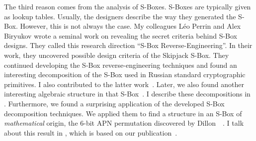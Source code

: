 The third reason comes from the analysis of S-Boxes. S-Boxes are typically given as lookup tables. Usually, the designers describe the way they generated the S-Box. However, this is not always the case.
My colleagues Léo Perrin and Alex Biryukov wrote a seminal work on revealing the secret criteria behind S-Box designs. They called this research direction ``S-Box Reverse-Engineering''. In their work, they uncovered possible design criteria of the Skipjack S-Box. They continued developing the S-Box reverse-engineering techniques and found an interesting decomposition of the S-Box used in Russian standard cryptographic primitives.
I also contributed to the latter work~\cite{OurKuz1}. Later, we also found another interesting algebraic structure in that S-Box~\cite{OurKuz2}. I describe these decompositions in . 
Furthermore, we found a surprising application of the developed S-Box decomposition techniques. We applied them to find a structure in an S-Box of \emph{mathematical} origin, the 6-bit APN permutation discovered by Dillon~\etal{}~\cite{DillonAPN}. I talk about this result in , which is based on our publication~\cite{OurAPN}.